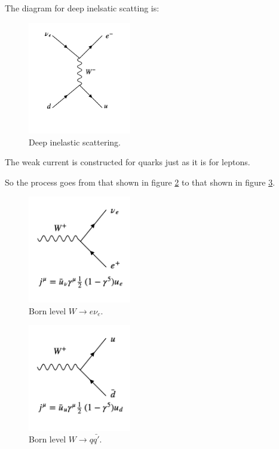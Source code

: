 The diagram for deep inelsatic scatting is:

\begin{figure}[!htb]
  \begin{center}
    \includegraphics[width=0.4\textwidth]{images/web_feynman/image_51.png}
    \caption[Deep inelastic scattering]{Deep inelastic scattering.}
    \label{fig:ch12_DIS}
  \end{center}
\end{figure}

The weak current is constructed for quarks just as it is for leptons.

So the process goes from that shown in figure \ref{fig:ch12_WENu} to that shown in figure \ref{fig:ch12_WQQ}.

\begin{figure}[!htb]
  \begin{center}
    \includegraphics[width=0.4\textwidth]{images/web_feynman/image_52.png}
    \caption[Born level $W\to e\nu_e$]{Born level $W\to e\nu_e$.}
    \label{fig:ch12_WENu}
  \end{center}
\end{figure}

\begin{figure}[!htb]
  \begin{center}
    \includegraphics[width=0.4\textwidth]{images/web_feynman/image_53.png}
    \caption[Born level $W\to q\bar{q'}$]{Born level $W\to q\bar{q'}$.}
    \label{fig:ch12_WQQ}
  \end{center}
\end{figure}

